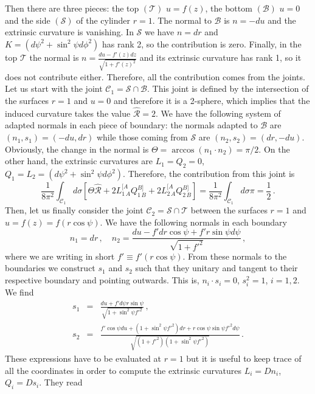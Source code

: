 \documentclass[11pt,letterpaper]{article}
\begin{document}
Then there are three pieces: the top $(\mathcal{T})$ $u=f(z)$, the bottom $(\mathcal{B})$ $u=0$ and the side $(\mathcal{S})$ of the cylinder $r=1$. The normal to $\mathcal{B}$ is $n=-du$ and the extrinsic curvature is vanishing. In $\mathcal{S}$ we have $n=dr$ and $K=(d\psi^2+\sin^2\psi d\phi^2)$ has rank 2, so the contribution is zero. Finally, in the top $\mathcal{T}$ the normal is $n=\frac{du-f'(z) dz}{\sqrt{1+f'(z)^2}}$ and its extrinsic curvature has rank 1, so it does not contribute either. Therefore, all the contribution comes from the joints. Let us start with the joint $\mathcal{C}_1=\mathcal{S}\cap \mathcal{B}$. This joint is defined by the intersection of the surfaces $r=1$ and $u=0$ and therefore it is a 2-sphere, which implies that the induced curvature takes the value $\hat{\mathcal{R}}=2$. We have the following system of adapted normals in each piece of boundary: the normals adapted to $\mathcal{B}$ are $(n_1, s_1)=(-du,dr)$ while those coming from $\mathcal{S}$ are $(n_2, s_2)=(dr, -du)$. Obviously, the change in the normal is $\Theta=\arccos(n_1\cdot n_2)=\pi/2$. On the other hand, the extrinsic curvatures are $L_1=Q_2=0$, $Q_1=L_2=(d\psi^2+\sin^2\psi d\phi^2)$. Therefore, the contribution from this joint is 
\begin{equation}
\frac{1}{8\pi^2}\int_{\mathcal{C}_1}d\sigma \left[\Theta\hat{\mathcal{R}}+2L^{[A}_{1\, A}Q^{B]}_{1\, B}+2L^{[A}_{2\, A}Q^{B]}_{2\, B}\right] =\frac{1}{8\pi^2}\int_{\mathcal{C}_1}d\sigma \pi=\frac{1}{2}\, .
\end{equation}
Then, let us finally consider the joint $\mathcal{C}_2=\mathcal{S}\cap\mathcal{T}$ between the surfaces $r=1$ and $u=f(z)=f(r \cos\psi)$. We have the following normals in each boundary
\begin{equation}
n_1=dr\, ,\quad n_2=\frac{du-f' dr \cos\psi+f' r \sin \psi d\psi }{\sqrt{1+f'^2}}\, ,
\end{equation}
where we are writing in short $f'\equiv f'(r\cos\psi)$. From these normals to the boundaries we construct $s_1$ and $s_2$ such that they unitary and tangent to their respective boundary and pointing outwards. This is, $n_i\cdot s_i=0$, $s_i^2=1$, $i=1,2$. We find
\begin{eqnarray}
s_1&=&\frac{du+f' d\psi r \sin\psi }{\sqrt{1+\sin^2\psi f'^2}}\, ,\\
s_2&=&\frac{ f' \cos\psi du+(1+\sin^2\psi f'^2)dr+r\cos\psi\sin\psi f'^2 d\psi}{\sqrt{(1+f'^2)(1+\sin^2\psi f'^2)}}\, .
\end{eqnarray}
These expressions have to be evaluated at $r=1$ but it is useful to keep trace of all the coordinates in order to compute the extrinsic curvatures $L_i=Dn_i$, $Q_i=Ds_i$. They read
\end{document}
